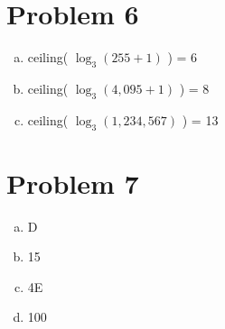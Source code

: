 \documentclass[11pt]{article}
\begin{document}
\section*{Problem 6}
\begin{enumerate}[(a)]
	\item ceiling( $\log _3 (255+1)$ ) = 6
	\item ceiling( $\log _3 (4,095+1)$ ) = 8
	\item ceiling( $\log _3 (1,234,567)$ ) = 13
\end{enumerate}

\section*{Problem 7}
\begin{enumerate}[(a)]
	\item D
	\item 15
	\item 4E
	\item 100
\end{enumerate}
\end{document}
